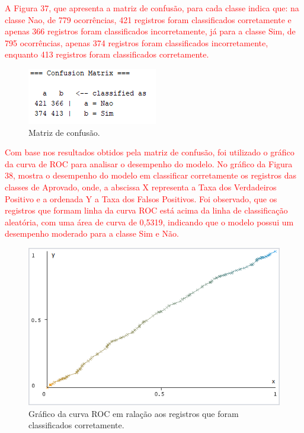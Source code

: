 \textcolor{red}{A Figura 37, que apresenta a matriz de confusão, para cada classe indica que: na classe Nao, de 779 ocorrências, 421 registros foram classificados corretamente e apenas 366 registros foram classificados incorretamente, já para a classe Sim, de 795 ocorrências, apenas 374 registros foram classificados incorretamente, enquanto 413 registros foram classificados corretamente.}

\par
\begin{figure}[!htp]
	\begin{center}
    \caption{\label{fig:waveform_fig} Matriz de confusão.}
	\includegraphics[scale=0.99]{Figuras/Matriz_de_classificacao.png}
	\end{center}
\end{figure}

\par
\textcolor{red}{Com base nos resultados obtidos pela matriz de confusão, foi utilizado o gráfico da curva de ROC para analisar o desempenho do modelo. No gráfico da Figura 38, mostra o desempenho do modelo em classificar corretamente os registros das classes de Aprovado, onde, a abscissa X representa a Taxa dos Verdadeiros Positivo e a ordenada Y a Taxa dos Falsos Positivos. Foi observado, que os registros que formam linha da curva ROC está acima da linha de classificação aleatória, com uma área de curva de 0,5319, indicando que o modelo possui um desempenho moderado para a classe Sim e Não.}

\par
\begin{figure}[!htp]
	\begin{center}
    \caption{\label{fig:waveform_fig} Gráfico da curva ROC em ralação aos registros que foram classificados corretamente.} 
	\includegraphics[scale=0.80]{Figuras/Curva_roc_projeto.png}
	\end{center}
\end{figure}

